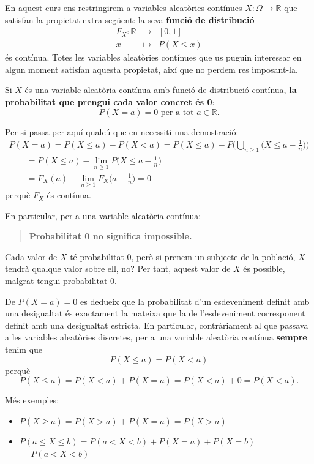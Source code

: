 \documentclass[
]{book}
\providecommand{\tightlist}{%
  \setlength{\itemsep}{0pt}\setlength{\parskip}{0pt}}
\renewcommand{\leq}{\leqslant}
\renewcommand{\geq}{\geqslant}
\newenvironment{rmdblock}[1]
  {
  \begin{itemize}
  \renewcommand{\labelitemi}{
    \raisebox{-.7\height}[0pt][0pt]{
      {\setkeys{Gin}{width=3em,keepaspectratio}\texttt{[image: Bioestadística-II\_files/figure-html/\#1]}}
    }
  }
  \setlength{\fboxsep}{1em}
  \begin{kframe}
  \item
  }
  {
  \end{kframe}
  \end{itemize}
  }
\newenvironment{rmdcorbes}
  {\begin{rmdblock}{corbes}}
  {\end{rmdblock}}
\theoremstyle{definition}
\theoremstyle{definition}
\theoremstyle{definition}
\theoremstyle{remark}
\begin{document}
En aquest curs ens restringirem a variables aleatòries contínues \(X: \Omega\to \mathbb{R}\) que satisfan la propietat extra següent: la seva \textbf{funció de distribució}
\[
\begin{array}{rcl}
F_X: \mathbb{R} & \to & [0,1]\\
x &\mapsto &P(X\leq x)
\end{array}
\]
és contínua. Totes les variables aleatòries contínues que us puguin interessar en algun moment satisfan aquesta propietat, així que no perdem res imposant-la.

Si \(X\) és una variable aleatòria contínua amb funció de distribució contínua, \textbf{la probabilitat que prengui cada valor concret és 0}:
\[
P(X=a)=0 \text{ per a tot $a \in \mathbb{R}$}.
\]

\begin{rmdcorbes}
Per si passa per aquí qualcú que en necessiti una demostració:
\[
\begin{array}{l}
\displaystyle P(X=a) = P(X\leq a)-P(X<a)=P(X\leq a)-P\Big(\bigcup_{n\geq 1} \Big(X\leq a-\frac{1}{n}\Big)\Big)\\
\displaystyle \qquad= P(X\leq a)-\lim_{n\geq 1}P\Big(X\leq a-\frac{1}{n}\Big)\\
\displaystyle \qquad= F_X(a)-\lim_{n\geq 1}F_X\Big(a-\frac{1}{n}\Big)=0
\end{array}
\]
perquè \(F_X\) és contínua.
\end{rmdcorbes}

En particular, per a una variable aleatòria contínua:

\begin{quote}
\textbf{Probabilitat 0 no significa impossible.}
\end{quote}

Cada valor de \(X\) té probabilitat 0, però si prenem un subjecte de la població, \(X\) tendrà qualque valor sobre ell, no? Per tant, aquest valor de \(X\) és possible, malgrat tengui probabilitat 0.

De \(P(X=a)=0\) es dedueix que la probabilitat d'un esdeveniment definit amb una desigualtat és exactament la mateixa que la de l'esdeveniment corresponent definit amb una desigualtat estricta. En particular, contràriament al que passava a les variables aleatòries discretes, per a una variable aleatòria contínua \textbf{sempre} tenim que
\[
P(X\leq a)=P(X<a)
\]
perquè
\[
P(X\leq a)=P(X<a)+P(X=a)=P(X<a)+0=P(X<a).
\]

Més exemples:

\begin{itemize}
\tightlist
\item
  \(P(X\geq a)=P(X> a)+P(X=a)=P(X> a)\)
\item
  \(P(a \leq X\leq b)=P(a<X <b)+P(X=a)+P(X=b)\) \(=P(a<X <b)\)
\end{itemize}
\end{document}
